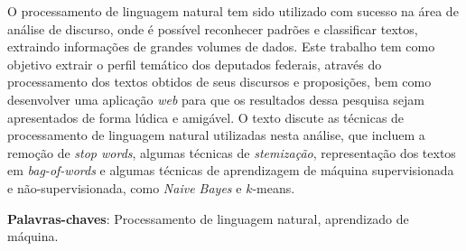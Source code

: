 \begin{resumo}
O processamento de linguagem natural tem sido utilizado com sucesso na área de análise de discurso, onde é possível reconhecer padrões e classificar textos, extraindo informações de grandes volumes de dados. Este trabalho tem como objetivo extrair o perfil temático dos deputados federais, através do processamento dos textos obtidos de seus discursos e proposições, bem como desenvolver uma aplicação \textit{web} para que os resultados dessa pesquisa sejam apresentados de forma lúdica e amigável. O texto discute as técnicas de processamento de linguagem natural utilizadas nesta análise, que incluem a remoção de \textit{stop words}, algumas técnicas de \textit{stemização}, representação dos textos em \textit{bag-of-words} e algumas técnicas de aprendizagem de máquina supervisionada e não-supervisionada, como \textit{Naive Bayes} e \(k\)-means.

 \vspace{\onelineskip}

 \noindent
 \textbf{Palavras-chaves}: Processamento de linguagem natural, aprendizado de máquina.
\end{resumo}

